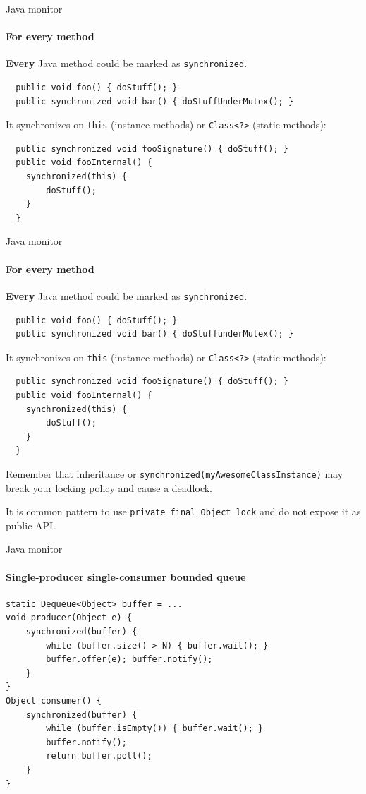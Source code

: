 \begin{frame}[t,fragile]{Java monitor}
\framesubtitle{For every method}

\textbf{Every} Java method could be marked as \texttt{synchronized}.
\begin{verbatim}
  public void foo() { doStuff(); }
  public synchronized void bar() { doStuffUnderMutex(); }
\end{verbatim}

It synchronizes on \texttt{this} (instance methods) or \texttt{Class<?>} (static methods):
\begin{verbatim}
  public synchronized void fooSignature() { doStuff(); }
  public void fooInternal() {
    synchronized(this) {
        doStuff();
    }
  }
\end{verbatim}

\end{frame}


\begin{frame}{Java monitor}
\framesubtitle{For every method}

\textbf{Every} Java method could be marked as \texttt{synchronized}.
\begin{verbatim}
  public void foo() { doStuff(); }
  public synchronized void bar() { doStuffunderMutex(); }
\end{verbatim}

It synchronizes on \texttt{this} (instance methods) or \texttt{Class<?>} (static methods):
\begin{verbatim}
  public synchronized void fooSignature() { doStuff(); }
  public void fooInternal() {
    synchronized(this) {
        doStuff();
    }
  }
\end{verbatim}

Remember that inheritance or \texttt{synchronized(myAwesomeClassInstance)} may break your locking policy and cause a deadlock.

It is common pattern to use \texttt{private final Object lock} and do not expose it as public API.
\end{frame}


\begin{frame}[fragile]{Java monitor}
\framesubtitle{Single-producer single-consumer bounded queue}

\begin{verbatim}
static Dequeue<Object> buffer = ...
void producer(Object e) {
    synchronized(buffer) {
        while (buffer.size() > N) { buffer.wait(); }
        buffer.offer(e); buffer.notify();
    }
}
Object consumer() {
    synchronized(buffer) {
        while (buffer.isEmpty()) { buffer.wait(); }
        buffer.notify();
        return buffer.poll(); 
    }
}
\end{verbatim}

\end{frame}


